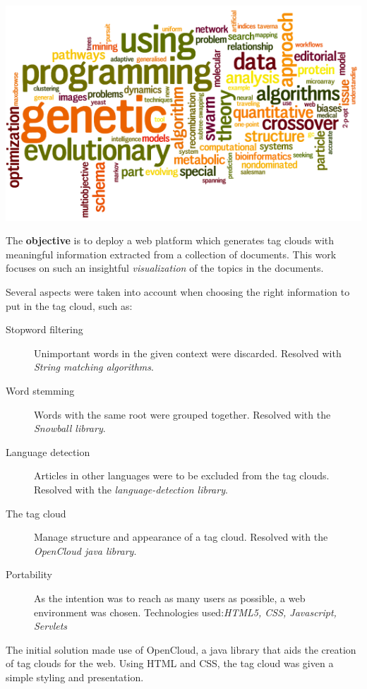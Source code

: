 \documentclass[a0paper, portrait]{baposter}
\begin{document}
\begin{poster}
{    \includegraphics[width=\linewidth]{wordle2.png}
    \label{fig:1}
    
    The {\bf objective} is to deploy a web platform which generates tag clouds with meaningful information extracted from a collection of documents. This work focuses on such an insightful {\em visualization} of the topics in the documents. %
  }

   {
    Several aspects were taken into account when choosing the right information to put in the tag cloud, such as: \newline
    \begin{description}
    \item[Stopword filtering] Unimportant words in the given context were discarded. Resolved with {\em String matching algorithms}.
    \item[Word stemming] Words with the same root were grouped together. Resolved with the {\em Snowball library}.
    \item[Language detection] Articles in other languages were to be excluded from the tag clouds. Resolved with the {\em language-detection library}.
    \item[The tag cloud] Manage structure and appearance of a tag cloud. Resolved with the {\em OpenCloud java library}.
    \item[Portability] As the intention was to reach as many users as possible, a web environment was chosen. Technologies used:{\em HTML5, CSS, Javascript, Servlets}
    \end{description}
  }
   {
    The initial solution made use of OpenCloud, a java library that aids the creation of tag clouds for the web. Using HTML and CSS, the tag cloud was given a simple styling and presentation.
    
}
\end{poster}
\end{document}
